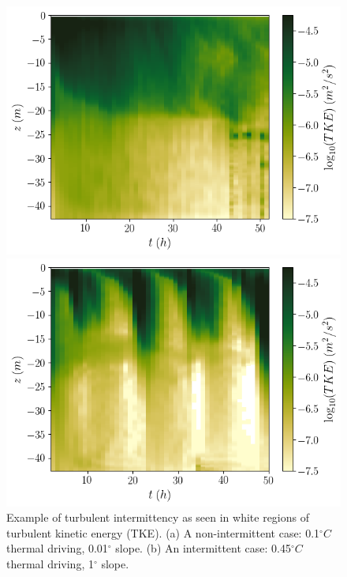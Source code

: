 \documentclass[draft]{agujournal2019}
\begin{document}
\begin{figure}[h!]
    \centering
    \begin{minipage}{0.4\textwidth}
        \includegraphics[trim={0 0cm 3cm 0cm},clip,width=\textwidth]{Figures/dslope2/e_hovmoller.png}
    \end{minipage}%
    \begin{minipage}{0.5\textwidth}
        \includegraphics[trim={0 0cm 0 0cm},clip,width=\textwidth]{Figures/dT4/e_hovmoller.png}
    \end{minipage}
    \caption{Example of turbulent intermittency as seen in white regions of turbulent kinetic energy (TKE). (a) A non-intermittent case: 0.1$^{\circ}C$ thermal driving, 0.01$^{\circ}$ slope. (b) An intermittent case: 0.45$^{\circ}C$ thermal driving, 1$^{\circ}$ slope.}
    \label{fig:intermittency}
\end{figure}
\end{document}
